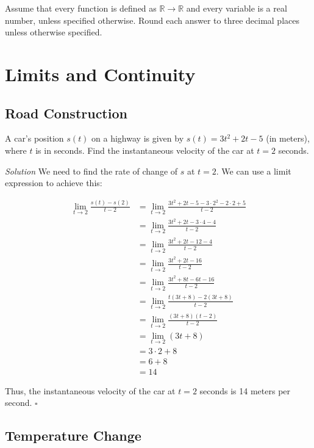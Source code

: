 \documentclass{article}
\begin{document}
Assume that every function is defined as \(\mathbb{R} \to \mathbb{R}\) and
every variable is a real number, unless specified otherwise. Round each answer
to three decimal places unless otherwise specified.

\section{Limits and Continuity}

\subsection{Road Construction}

A car's position \(s(t)\) on a highway is given by \(s(t) = 3t^2 + 2t - 5\) (in
meters), where \(t\) is in seconds. Find the instantaneous velocity of the car
at \(t = 2\) seconds.

\textit{Solution} \: We need to find the rate of change of \(s\) at \(t = 2\).
We can use a limit expression to achieve this:

\[
  \begin{split}
    \lim_{t \rightarrow 2} \frac{s(t) - s(2)}{t - 2}
      & = \lim_{t \rightarrow 2} \frac{3t^2 + 2t - 5 - 3 \cdot 2^2 - 2 \cdot 2 + 5}{t - 2} \\
      & = \lim_{t \rightarrow 2} \frac{3t^2 + 2t - 3 \cdot 4 - 4}{t - 2} \\
      & = \lim_{t \rightarrow 2} \frac{3t^2 + 2t - 12 - 4}{t - 2} \\
      & = \lim_{t \rightarrow 2} \frac{3t^2 + 2t - 16}{t - 2} \\
      & = \lim_{t \rightarrow 2} \frac{3t^2 + 8t - 6t - 16}{t - 2} \\
      & = \lim_{t \rightarrow 2} \frac{t(3t + 8) - 2(3t + 8)}{t - 2} \\
      & = \lim_{t \rightarrow 2} \frac{(3t + 8)(t - 2)}{t - 2} \\
      & = \lim_{t \rightarrow 2} (3t + 8) \\
      & = 3 \cdot 2 + 8 \\
      & = 6 + 8 \\
      & = 14
  \end{split}
\]

Thus, the instantaneous velocity of the car at \(t = 2\) seconds is 14 meters
per second. \(\square\)

\subsection{Temperature Change}
\end{document}
